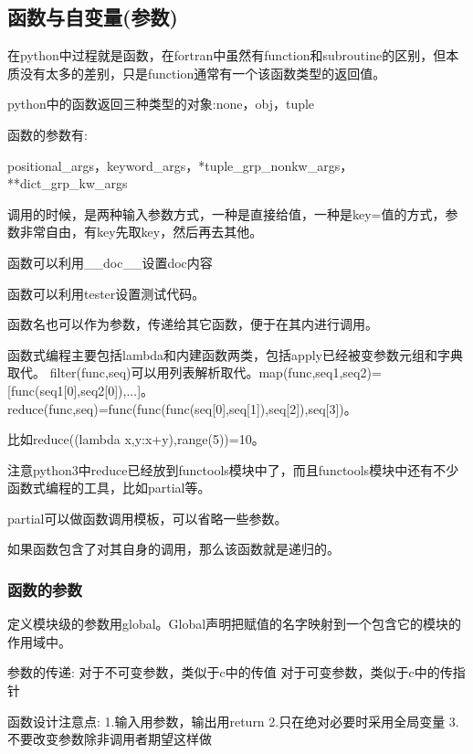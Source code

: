 \documentclass[twoside,11pt]{book}
\begin{document}
\subsection{函数与自变量(参数)}

在python中过程就是函数，在fortran中虽然有function和subroutine的区别，但本质没有太多的差别，只是function通常有一个该函数类型的返回值。


python中的函数返回三种类型的对象:none，obj，tuple

函数的参数有:

positional\_args，keyword\_args，*tuple\_grp\_nonkw\_args，**dict\_grp\_kw\_args

调用的时候，是两种输入参数方式，一种是直接给值，一种是key=值的方式，参数非常自由，有key先取key，然后再去其他。

函数可以利用\_\_doc\_\_设置doc内容

函数可以利用tester设置测试代码。

函数名也可以作为参数，传递给其它函数，便于在其内进行调用。

函数式编程主要包括lambda和内建函数两类，包括apply已经被变参数元组和字典取代。
filter(func,seq)可以用列表解析取代。map(func,seq1,seq2)=[func(seq1[0],seq2[0]),...]。
reduce(func,seq)=func(func(func(seq[0],seq[1]),seq[2]),seq[3])。

比如reduce((lambda x,y:x+y),range(5))=10。

注意python3中reduce已经放到functools模块中了，而且functools模块中还有不少函数式编程的工具，比如partial等。

partial可以做函数调用模板，可以省略一些参数。

如果函数包含了对其自身的调用，那么该函数就是递归的。

\subsubsection{函数的参数}
定义模块级的参数用global。Global声明把赋值的名字映射到一个包含它的模块的作用域中。

参数的传递:
对于不可变参数，类似于c中的传值
对于可变参数，类似于c中的传指针

函数设计注意点:
1.输入用参数，输出用return
2.只在绝对必要时采用全局变量
3.不要改变参数除非调用者期望这样做
\end{document}
